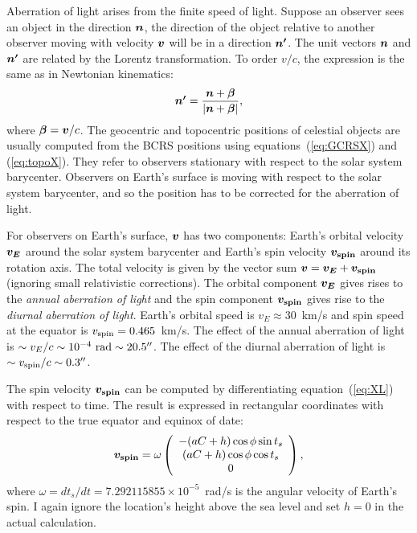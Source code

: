 \documentclass[12pt]{article}
\newcommand \beq {\begin{equation}}
\newcommand \eeq {\end{equation}}
\newcommand{\ve}[1]{\mbox{\boldmath $#1$}}
\begin{document}
Aberration of light arises from the finite speed of light. Suppose an observer 
sees an object in the direction $\ve{n}$, the direction of the object 
relative to another observer moving with velocity $\ve{v}$ will be in 
a direction $\ve{n'}$. The unit vectors $\ve{n}$ and $\ve{n'}$ are related 
by the Lorentz transformation. To order $v/c$, the expression is the same as 
in Newtonian kinematics:
\beq
  \ve{n'} = \frac{\ve{n} + \ve{\beta}}{|\ve{n} + \ve{\beta}|} ,
\label{eq:aberration}
\eeq
where $\ve{\beta} = \ve{v}/c$. The geocentric and topocentric positions 
of celestial objects are usually computed from the BCRS positions 
using equations~(\ref{eq:GCRSX}) and (\ref{eq:topoX}). They refer 
to observers stationary with respect to the solar system barycenter. 
Observers on Earth's surface is moving with respect to the solar system barycenter, 
and so the position has to be corrected for the aberration of light. 

For observers on Earth's surface, $\ve{v}$ has two components: Earth's 
orbital velocity $\ve{v_E}$ around the solar system barycenter 
and Earth's spin velocity $\ve{v_{\rm spin}}$ around its rotation axis. 
The total velocity is given by the vector sum 
$\ve{v}=\ve{v_E} + \ve{v_{\rm spin}}$ (ignoring small relativistic 
corrections). The orbital component $\ve{v_E}$ gives rises to the 
{\em annual aberration of light} and the spin component $\ve{v_{\rm spin}}$ 
gives rise to the {\em diurnal aberration of light}. Earth's orbital 
speed is $v_E \approx 30$~km/s and spin speed at the equator is 
$v_{\rm spin}=0.465$~km/s. The effect of the annual aberration of light is 
$\sim v_E/c \sim 10^{-4}~{\rm rad}\sim 20.5''$. The effect of the 
diurnal aberration of light is $\sim v_{\rm spin}/c \sim 0.3''$.

The spin velocity $\ve{v_{\rm spin}}$ can be computed by differentiating 
equation~(\ref{eq:XL}) with respect to time. The result is expressed 
in rectangular coordinates with respect to the true equator and equinox of date:
\beq
  \ve{v_{\rm spin}} = \omega \left( \begin{array}{c} 
 -(aC +h) \cos \phi \sin t_s \\ (aC+h) \cos \phi \cos t_s \\ 0 \end{array} \right) ,
\label{eq:vspin}
\eeq
where $\omega=dt_s/dt = 7.292115855\times 10^{-5}$~rad/s is the angular velocity 
of Earth's spin. I again ignore the location's height above the sea level and 
set $h=0$ in the actual calculation. 
\end{document}
